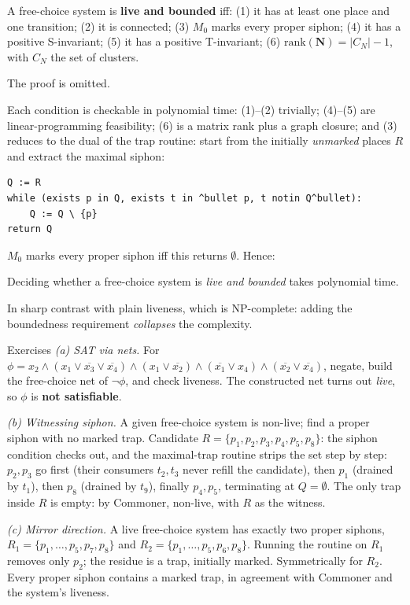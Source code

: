 \begin{theorem}
A free-choice system is \textbf{live and bounded} iff: (1) it has at least one place and one transition; (2) it is connected; (3) $M_0$ marks every proper siphon; (4) it has a positive S-invariant; (5) it has a positive T-invariant; (6) $\mathrm{rank}(\mathbf{N}) = |C_N| - 1$, with $C_N$ the set of clusters.
\end{theorem}
The proof is omitted.

Each condition is checkable in polynomial time: (1)--(2) trivially; (4)--(5) are linear-programming feasibility; (6) is a matrix rank plus a graph closure; and (3) reduces to the dual of the trap routine: start from the initially \emph{unmarked} places $R$ and extract the maximal siphon:
\begin{lstlisting}
Q := R
while (exists p in Q, exists t in ^bullet p, t notin Q^bullet):
    Q := Q \ {p}
return Q
\end{lstlisting}
$M_0$ marks every proper siphon iff this returns $\emptyset$. Hence:

\begin{theorem}
Deciding whether a free-choice system is \emph{live and bounded} takes polynomial time.
\end{theorem}
In sharp contrast with plain liveness, which is \textsf{NP}-complete: adding the boundedness requirement \emph{collapses} the complexity.

\begin{examplebox}{Exercises}
\emph{(a) SAT via nets.} For $\phi = x_2 \wedge (x_1 \vee \overline{x_3} \vee \overline{x_4}) \wedge (x_1 \vee \overline{x_2}) \wedge (\overline{x_1} \vee x_4) \wedge (\overline{x_2} \vee \overline{x_4})$, negate, build the free-choice net of $\neg\phi$, and check liveness. The constructed net turns out \emph{live}, so $\phi$ is \textbf{not satisfiable}.
\par\smallskip
\emph{(b) Witnessing siphon.} A given free-choice system is non-live; find a proper siphon with no marked trap. Candidate $R = \{p_1, p_2, p_3, p_4, p_5, p_8\}$: the siphon condition checks out, and the maximal-trap routine strips the set step by step: $p_2, p_3$ go first (their consumers $t_2, t_3$ never refill the candidate), then $p_1$ (drained by $t_1$), then $p_8$ (drained by $t_9$), finally $p_4, p_5$, terminating at $Q = \emptyset$. The only trap inside $R$ is empty: by Commoner, non-live, with $R$ as the witness.
\par\smallskip
\emph{(c) Mirror direction.} A live free-choice system has exactly two proper siphons, $R_1 = \{p_1, \ldots, p_5, p_7, p_8\}$ and $R_2 = \{p_1, \ldots, p_5, p_6, p_8\}$. Running the routine on $R_1$ removes only $p_2$; the residue is a trap, initially marked. Symmetrically for $R_2$. Every proper siphon contains a marked trap, in agreement with Commoner and the system's liveness.
\end{examplebox}
